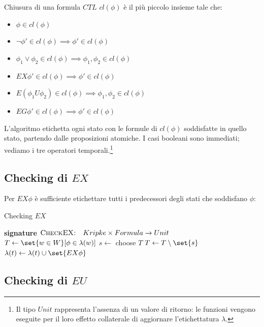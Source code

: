 \begin{definition}{Chiusura di una formula \(CTL\)}
  \(cl(\phi)\) è il più piccolo insieme tale che:
  \begin{itemize}
    \item \(\phi \in cl(\phi)\)
    \item \(\neg \phi' \in cl(\phi)\implies \phi' \in cl(\phi)\)
    \item \(\phi_1 \lor \phi_2 \in cl(\phi)\implies \phi_1, \phi_2 \in cl(\phi)\)
    \item \(EX \phi' \in cl(\phi)\implies \phi' \in cl(\phi)\)
    \item \(E(\phi_1 U \phi_2) \in cl(\phi)\implies \phi_1, \phi_2 \in cl(\phi)\)
    \item \(EG \phi' \in cl(\phi)\implies \phi' \in cl(\phi)\)
  \end{itemize}
\end{definition}

L'algoritmo etichetta ogni stato con le formule di \(cl(\phi)\) soddisfatte in quello stato, partendo dalle proposizioni atomiche. I casi booleani sono immediati; vediamo i tre operatori temporali.\footnote{Il tipo \(Unit\) rappresenta l'assenza di un valore di ritorno: le funzioni vengono eseguite per il loro effetto collaterale di aggiornare l'etichettatura \(\lambda\).}

\subsection{Checking di \texorpdfstring{\(EX\)}{EX}}

Per \(EX\phi\) è sufficiente etichettare tutti i predecessori degli stati che soddisfano \(\phi\):

\begin{algorithmdesc}{Checking \(EX\)}
  \begin{algorithmic}[1]
    \Statex{} \textbf{signature} \(\textsc{CheckEX:} \quad Kripke \times Formula \to Unit\)
    \State{} \(T \gets \set{w \in W}[\phi \in \lambda(w)]\)
    \State{} \(s \gets\) choose \(T\)
    \State{} \(T \gets T\setminus\set{s}\)
    \State{} \(\lambda(t)\gets \lambda(t)\cup\set{EX \phi}\)
    \EndFor{}
    \EndWhile{}
    \EndFunction{}
  \end{algorithmic}
\end{algorithmdesc}

\subsection{Checking di \texorpdfstring{\(EU\)}{EU}}

